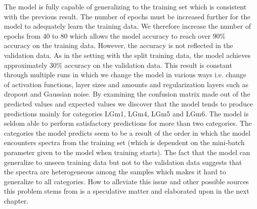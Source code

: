 The model is fully capable of generalizing to the training set which is consistent with the previous result. The number of epochs must be increased further for the model to adequately learn the training data. We therefore increase the number of epochs from $40$ to $80$ which allows the model accuracy to reach over $90\%$ accuracy on the training data. However, the accuracy is not reflected in the validation data. As in the setting with the split training data, the model achieves approximately $30\%$ accuracy on the validation data. This result is constant through multiple runs in which we change the model in various ways i.e. change of activation functions, layer sizes and amounts and regularization layers such as dropout and Gaussian noise. By examining the confusion matrix made out of the predicted values and expected values we discover that the model tends to produce predictions mainly for categories LGm1, LGm4, LGm5 and LGm6. The model is seldom able to perform satisfactory predictions for more than two categories. The categories the model predicts seem to be a result of the order in which the model encounters spectra from the training set (which is dependent on the mini-batch parameter given to the model when training starts). The fact that the model can generalize to unseen training data but not to the validation data suggests that the spectra are heterogeneous among the samples which makes it hard to generalize to all categories. How to alleviate this issue and other possible sources this problem stems from is a speculative matter and elaborated upon in the next chapter.


